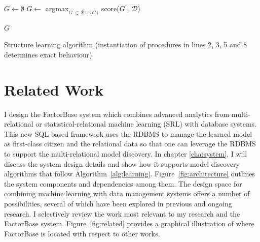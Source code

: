\documentclass{sfuthesis}
\begin{document}
\begin{algorithm}[!h] 
\begin{algorithmic}[1]
\STATE $G \leftarrow 	\emptyset$
    \ENDFOR
	\STATE 	$G \leftarrow$ argmax$_{G^{\prime} \in \mathcal R\cup \{G\}}$ score($G^{\prime} $, $\mathcal D$)

\ENDWHILE

\STATE \Return $G$
\end{algorithmic}

\caption{Structure learning algorithm (instantiation of procedures in lines 2, 3, 5 and 8 determines exact behaviour) 
\label{alg:learning}}
\end{algorithm}




\section{Related Work} \label{sec:related}
I design the FactorBase system  which combines advanced analytics from multi-relational or statistical-relational machine learning (SRL) with database systems. 
This new SQL-based framework uses the RDBMS to manage the learned model  as first-class citizen and the relational data so that one can leverage the RDBMS to support the multi-relational model discovery.
 In chapter \ref{cha:system}, I  will discuss the system design details and show how it supports model discovery algorithms that follow Algorithm~\ref{alg:learning}. Figure~\ref{fig:architecture} outlines the system components and dependencies among them. The design space for combining machine learning with data management systems offers a number of possibilities, several of which have been explored in previous and ongoing research. I  selectively review the work most relevant to my research and the FactorBase system. Figure~\ref{fig:related} provides a graphical illustration of where FactorBase is located with respect to other works.
\end{document}
